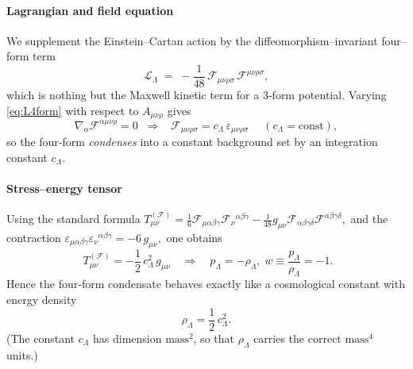 \documentclass{article}
\begin{document}
\paragraph{Lagrangian and field equation}
We supplement the Einstein--Cartan action by the diffeomorphism--invariant
four--form term
\begin{equation}\label{eq:L4form}
  \mathcal L_\Lambda \;=\;
  -\frac{1}{48}\,\mathcal F_{\mu\nu\rho\sigma}\,
                    \mathcal F^{\mu\nu\rho\sigma},
\end{equation}
which is nothing but the Maxwell kinetic term for a 3‑form potential.  Varying
\eqref{eq:L4form} with respect to $A_{\mu\nu\rho}$ gives
\begin{equation}\label{eq:eomF}
  \nabla_\alpha \mathcal F^{\alpha\mu\nu\rho}=0
  \;\;\Longrightarrow\;\;
  \boxed{\;
  \mathcal F_{\mu\nu\rho\sigma} =
  c_\Lambda\,\varepsilon_{\mu\nu\rho\sigma}
  \;}
  \quad(c_\Lambda=\text{const}),
\end{equation}
so the four‑form \emph{condenses} into a constant background set by an
integration constant $c_\Lambda$.

\paragraph{Stress--energy tensor}
Using the standard formula
\(
T_{\mu\nu}^{(\mathcal F)}=
\tfrac16 \mathcal F_{\mu\alpha\beta\gamma}
        \mathcal F_{\nu}{}^{\alpha\beta\gamma}
        -\tfrac1{48}g_{\mu\nu}\mathcal F_{\alpha\beta\gamma\delta}
                               \mathcal F^{\alpha\beta\gamma\delta},
\)
and the contraction
\(
\varepsilon_{\mu\alpha\beta\gamma}\varepsilon_{\nu}{}^{\alpha\beta\gamma}
=-6\,g_{\mu\nu},
\)
one obtains
\begin{equation}\label{eq:TF}
  \boxed{\;
  T_{\mu\nu}^{(\mathcal F)} = -\frac{1}{2}\,c_\Lambda^{2}\,g_{\mu\nu}}
  \quad\Longrightarrow\quad
  p_\Lambda = -\rho_\Lambda,\;
  w\equiv\frac{p_\Lambda}{\rho_\Lambda} = -1 .
\end{equation}
Hence the four‑form condensate behaves exactly like a cosmological constant with
energy density
\begin{equation}\label{eq:rhoLambda}
  \rho_\Lambda = \frac{1}{2}\,c_\Lambda^{2}.
\end{equation}
(The constant $c_\Lambda$ has dimension $\text{mass}^2$, so that
$\rho_\Lambda$ carries the correct $\text{mass}^4$ units.)
\end{document}

